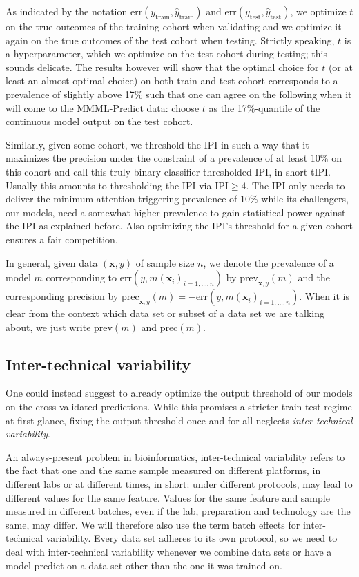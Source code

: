 As indicated by the notation $\text{err}(y_\text{train}, \hat{y}_\text{train})$ and 
$\text{err}(y_\text{test}, \hat{y}_\text{test})$, we optimize $t$ on the true outcomes 
of the training cohort when validating and we optimize it again on the true outcomes of the test cohort 
when testing. Strictly speaking, $t$ is a hyperparameter, which we optimize on the 
test cohort during testing; this sounds delicate. The results however will show that the optimal 
choice for $t$ (or at least an 
almost optimal choice) on both train and test cohort corresponds to a prevalence of 
slightly above 17\% such that one can agree on the following when it will come to the MMML-Predict 
data: choose $t$ as the 17\%-quantile of the continuous model output on the test cohort.

Similarly, given some cohort, we threshold the IPI in such a way that it maximizes the precision under 
the constraint of a prevalence of at least \num{10}\% on this cohort and call this truly 
binary classifier thresholded IPI, in short tIPI. Usually this amounts to thresholding the IPI via 
$\text{IPI} \geq 4$. The IPI only needs to deliver the minimum 
attention-triggering prevalence of \num{10}\% while its challengers, our models, need a somewhat 
higher prevalence to gain statistical power against the IPI as explained before. Also optimizing 
the IPI's threshold for a given cohort ensures a fair competition.

In general, given data $(\mathbf{x}, y)$ of sample size $n$, we denote the prevalence of a model 
$m$ corresponding to 
$\text{err}(y, m(\mathbf{x}_i)_{i = 1, \ldots, n})$ by $\text{prev}_{\mathbf{x}, y}(m)$ and the corresponding 
precision by $\text{prec}_{\mathbf{x}, y}(m) = -\text{err}(y, m(\mathbf{x}_i)_{i = 1, \ldots, n})$. When it 
is clear from the context which data set or subset of a data set we are talking about, we just write 
$\text{prev}(m)$ and $\text{prec}(m)$.

\subsection{Inter-technical variability} 
One could instead suggest to already optimize the output threshold of our models on the cross-validated 
predictions. While this promises a stricter train-test regime at first glance, fixing the output 
threshold once and for all neglects \textit{inter-technical variability}. 

An always-present problem in bioinformatics, inter-technical variability refers to the fact that 
one and the same sample measured on different platforms, in different labs or at different times, 
in short: under different protocols, may lead to different values for the same feature. 
Values for the same feature and sample measured in different batches, even if the lab, preparation 
and technology are the same, may differ. We will therefore also use the term batch effects for 
inter-technical variability. Every data set adheres to its own protocol, so we need to deal with 
inter-technical variability whenever we combine data sets or have a model predict on a data set 
other than the one it was trained on.

